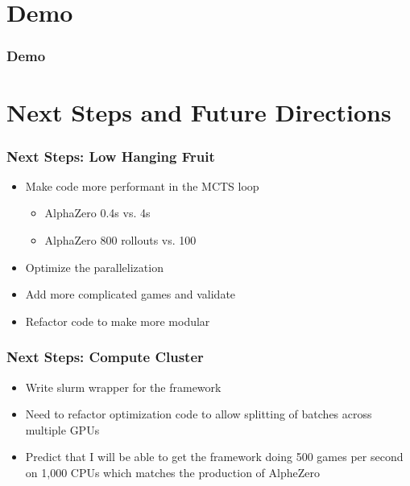 \documentclass{beamer}
\begin{document}
\section{Demo}


\begin{frame}
\frametitle{Demo}
\end{frame}


\section{Next Steps and Future Directions}


\begin{frame}
  \frametitle{Next Steps: Low Hanging Fruit}

  \begin{itemize}
    \item Make code more performant in the MCTS loop
      \begin{itemize}
        \item{AlphaZero 0.4s vs. 4s}
        \item{AlphaZero 800 rollouts vs. 100}
      \end{itemize}
    \item Optimize the parallelization
    \item Add more complicated games and validate
    \item Refactor code to make more modular
  \end{itemize}
\end{frame}



\begin{frame}
  \frametitle{Next Steps: Compute Cluster}

  \begin{itemize}
    \item Write slurm wrapper for the framework
    \item Need to refactor optimization code to allow splitting of batches across multiple GPUs
    \item Predict that I will be able to get the framework doing 500 games per second on 1,000 CPUs which matches the production of AlpheZero
  \end{itemize}
\end{frame}
\end{document}
